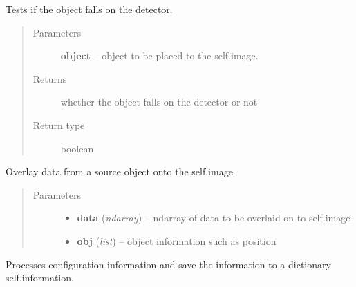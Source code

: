 \documentclass[a4paper,12pt,english]{sphinxmanual}
\begin{document}
\begin{fulllineitems}
\begin{fulllineitems}
\label{simulator:simulator.simulator.VISsimulator.objectOnDetector}
Tests if the object falls on the detector.
\begin{quote}\begin{description}
\item[{Parameters}] \leavevmode
\textbf{object} -- object to be placed to the self.image.

\item[{Returns}] \leavevmode
whether the object falls on the detector or not

\item[{Return type}] \leavevmode
boolean

\end{description}\end{quote}

\end{fulllineitems}


\begin{fulllineitems}
\label{simulator:simulator.simulator.VISsimulator.overlayToCCD}
Overlay data from a source object onto the self.image.
\begin{quote}\begin{description}
\item[{Parameters}] \leavevmode\begin{itemize}
\item {} 
\textbf{data} (\emph{ndarray}) -- ndarray of data to be overlaid on to self.image

\item {} 
\textbf{obj} (\emph{list}) -- object information such as position

\end{itemize}

\end{description}\end{quote}

\end{fulllineitems}


\begin{fulllineitems}
\label{simulator:simulator.simulator.VISsimulator.processConfigs}
Processes configuration information and save the information to a dictionary self.information.


\end{fulllineitems}
\end{fulllineitems}
\end{document}
